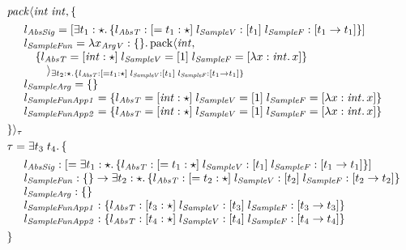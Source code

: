 \documentclass[12pt]{article}
\begin{document}
\pagestyle{empty}

\begin{align*}
    &\mathit{pack}\langle \mathit{int}\; \mathit{int}, \{ \\
    &\hspace{1em}\begin{array}{l}
        l_\mathit{AbsSig} = [\exists t_1: \star\ldotp \{
            l_\mathit{AbsT}: [= t_1: \star] \;
            l_\mathit{SampleV}: [t_1] \;
            l_\mathit{SampleF}: [t_1 \to t_1]
        \}] \\
        l_\mathit{SampleFun} = \lambda x_\mathit{ArgV}: \{\}\ldotp \mathrm{pack}\langle \mathit{int}, \\
        \hspace{1em}\{
            l_\mathit{AbsT} = [\mathit{int}: \star] \;
            l_\mathit{SampleV} = [1] \;
            l_\mathit{SampleF} = [\lambda x: \mathit{int}\ldotp x]
            \} \\
        \hspace{2em}\rangle_{\exists t_2: \star\ldotp \{
            l_\mathit{AbsT}: [= t_1: \star] \;
            l_\mathit{SampleV}: [t_1] \;
            l_\mathit{SampleF}: [t_1 \to t_1]
        \}} \\
        l_\mathit{SampleArg} = \{\} \\
        l_\mathit{SampleFunApp1} = \{
            l_\mathit{AbsT} = [\mathit{int}: \star] \;
            l_\mathit{SampleV} = [1] \;
            l_\mathit{SampleF} = [\lambda x: \mathit{int}\ldotp x]
        \} \\
        l_\mathit{SampleFunApp2} = \{
            l_\mathit{AbsT} = [\mathit{int}: \star] \;
            l_\mathit{SampleV} = [1] \;
            l_\mathit{SampleF} = [\lambda x: \mathit{int}\ldotp x]
        \}
    \end{array} \\
    &\}\rangle_\tau \\
    &\tau = \exists t_3\; t_4\ldotp \{ \\
    &\hspace{1em}\begin{array}{l}
        l_\mathit{AbsSig}: [= \exists t_1: \star\ldotp \{
            l_\mathit{AbsT}: [= t_1: \star] \;
            l_\mathit{SampleV}: [t_1] \;
            l_\mathit{SampleF}: [t_1 \to t_1]
        \}] \\
        l_\mathit{SampleFun}: \{\} \to \exists t_2: \star\ldotp \{
            l_\mathit{AbsT}: [= t_2: \star] \;
            l_\mathit{SampleV}: [t_2] \;
            l_\mathit{SampleF}: [t_2 \to t_2]
        \} \\
        l_\mathit{SampleArg}: \{\} \\
        l_\mathit{SampleFunApp1}: \{
            l_\mathit{AbsT}: [t_3: \star] \;
            l_\mathit{SampleV}: [t_3] \;
            l_\mathit{SampleF}: [t_3 \to t_3]
        \} \\
        l_\mathit{SampleFunApp2}: \{
            l_\mathit{AbsT}: [t_4: \star] \;
            l_\mathit{SampleV}: [t_4] \;
            l_\mathit{SampleF}: [t_4 \to t_4]
        \}
    \end{array} \\
    &\}
\end{align*}
\end{document}
